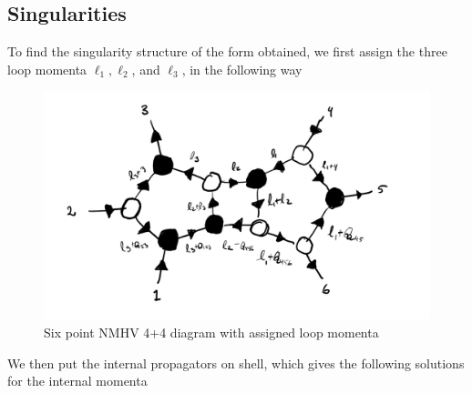 \documentclass[letter,11pt]{article}
\newcommand{\red}[1]{\textcolor{red}{#1}}
\newcommand{\blue}[1]{\textcolor{blue}{#1}}
\newcommand{\green}[1]{\textcolor{ForestGreen}{#1}}
\newcommand{\orange}[1]{\textcolor{orange}{#1}}
\newcommand{\ab}[1]{\langle #1 \rangle}
\newcommand{\sqb}[1]{[ #1 ]}
\newcommand{\aMs}[3]{\langle #1|#2|#3]}  		%
\begin{document}
\subsection{Singularities}
To find the singularity structure of the form obtained, we first assign the three loop momenta $\ell_1,\ell_2$, and $\ell_3$, in the following way
\begin{figure}[H]
	\centering
	\includegraphics[width=0.6\linewidth]{sing}
	\caption{Six point NMHV 4+4 diagram with assigned loop momenta}
	\label{fig:two-loop}
\end{figure}
We then put the internal propagators on shell, which gives the following solutions for the internal momenta
\end{document}
